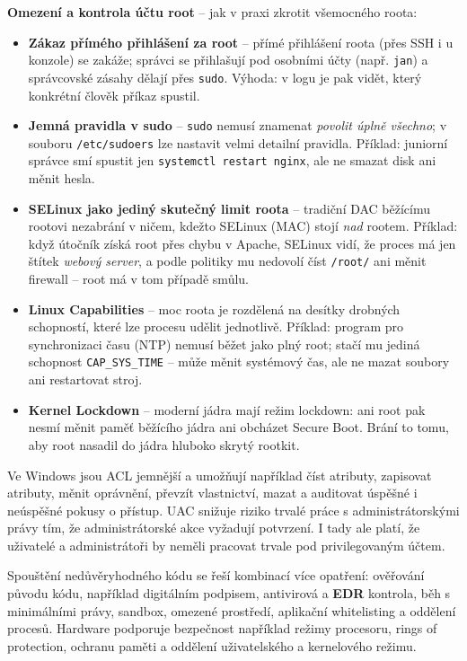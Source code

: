 \begin{notebox}
\textbf{Omezení a kontrola účtu root} -- jak v praxi zkrotit všemocného roota:
\begin{itemize}
  \item \textbf{Zákaz přímého přihlášení za root} -- přímé přihlášení roota (přes SSH i u konzole) se zakáže; správci se přihlašují pod osobními účty (např. \texttt{jan}) a správcovské zásahy dělají přes \texttt{sudo}. Výhoda: v logu je pak vidět, který konkrétní člověk příkaz spustil.
  \item \textbf{Jemná pravidla v sudo} -- \texttt{sudo} nemusí znamenat \emph{povolit úplně všechno}; v souboru \texttt{/etc/sudoers} lze nastavit velmi detailní pravidla. Příklad: juniorní správce smí spustit jen \texttt{systemctl restart nginx}, ale ne smazat disk ani měnit hesla.
  \item \textbf{SELinux jako jediný skutečný limit roota} -- tradiční DAC běžícímu rootovi nezabrání v ničem, kdežto SELinux (MAC) stojí \emph{nad} rootem. Příklad: když útočník získá root přes chybu v Apache, SELinux vidí, že proces má jen štítek \emph{webový server}, a podle politiky mu nedovolí číst \texttt{/root/} ani měnit firewall -- root má v tom případě smůlu.
  \item \textbf{Linux Capabilities} -- moc roota je rozdělená na desítky drobných schopností, které lze procesu udělit jednotlivě. Příklad: program pro synchronizaci času (NTP) nemusí běžet jako plný root; stačí mu jediná schopnost \texttt{CAP\_SYS\_TIME} -- může měnit systémový čas, ale ne mazat soubory ani restartovat stroj.
  \item \textbf{Kernel Lockdown} -- moderní jádra mají režim lockdown: ani root pak nesmí měnit paměť běžícího jádra ani obcházet Secure Boot. Brání to tomu, aby root nasadil do jádra hluboko skrytý rootkit.
\end{itemize}
\end{notebox}

Ve Windows jsou ACL jemnější a umožňují například číst atributy, zapisovat atributy, měnit oprávnění, převzít vlastnictví, mazat a auditovat úspěšné i neúspěšné pokusy o přístup. UAC snižuje riziko trvalé práce s administrátorskými právy tím, že administrátorské akce vyžadují potvrzení. I tady ale platí, že uživatelé a administrátoři by neměli pracovat trvale pod privilegovaným účtem.

Spouštění nedůvěryhodného kódu se řeší kombinací více opatření: ověřování původu kódu, například digitálním podpisem, antivirová a \textbf{EDR} kontrola, běh s minimálními právy, sandbox, omezené prostředí, aplikační whitelisting a oddělení procesů. Hardware podporuje bezpečnost například režimy procesoru, rings of protection, ochranu paměti a oddělení uživatelského a kernelového režimu.

